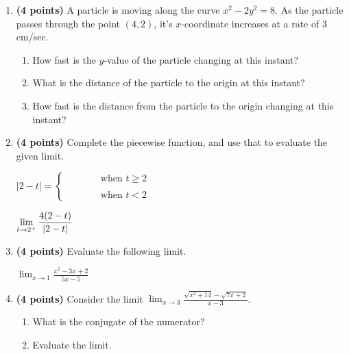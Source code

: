 \documentclass[12pt]{amsart}
\begin{document}
\begin{enumerate}
\vspace{2cm}
\newpage\def \b{2}\def \x{4}\def \y{2}\def \xchange{3}\def \ratrhs{8}\def \cirrhs{24}\def \hyprhs{8}\def \compy{2y^{2}}\def \ychangenum{6}\def \dist{20}\def \fracrat{18}\def \fraccirc{12}\def \frachyp{36}
\item {\bf (4 points)} 
 A particle is moving along the curve $x^2 - \compy = \hyprhs$. As the particle passes through the point $(\x,\y)$, it's $x$-coordinate increases at a rate of $\xchange$cm/sec. \begin{enumerate}
\item How fast is the $y$-value of the particle changing at this instant? \vfill
\item What is the distance of the particle to the origin at this instant? \vfill
\item How fast is the distance from the particle to the origin changing at this instant? \vfill
\end{enumerate}

\newpage\def \a{2}\def \k{4}\def \abstop{0}\def \ktop{1}
\item {\bf (4 points)} 
 Complete the piecewise function, and use that to evaluate the given limit.

\vspace{.5cm}

$|\a - t| = \begin{cases} \hspace{1cm} & \text{ when } t \geq \a \\ & \\ \hspace{1cm} & \text{ when } t < \a \end{cases}$

\vspace{.5cm}

$\displaystyle \lim_{t \rightarrow \a^+} \frac{\ifthenelse{\ktop=1}{\k}{}\ifthenelse{\abstop=1}{|\a-t|}{(\a-t)}}{\ifthenelse{\ktop=0}{\k}{}\ifthenelse{\abstop=0}{|\a-t|}{(\a-t)}}$

\vfill 
\def \a{1}\def \b{2}\def \k{5}\def \fancyp{x^{2}-3x^{}+2}\def \simplep{5x^{}-5}\def \fancyreduced{-1}\def \niceanstop{\frac{-1}{5}}\def \niceansbottom{-5}
\item {\bf (4 points)} 
 Evaluate the following limit. 

$\displaystyle \lim_{x\rightarrow \a} \frac{\fancyp}{\simplep}$

\vfill 
\newpage\def \a{3}\def \b{4}\def \ab{12}\def \c{14}\def \amb{-1}\def \ansroot{23}\def \firstroot{x^{2}+14}\def \secondroot{7x^{}+2}\def \porm{-1}
\item {\bf (4 points)} 
 Consider the limit $\displaystyle \lim_{x \rightarrow \a} \frac{\sqrt{\firstroot} - \sqrt{\secondroot}}{x-\a}$. \begin{enumerate}
\item What is the conjugate of the numerator? \vspace{3cm}
\item Evaluate the limit.
\end{enumerate}


\end{enumerate}
\end{document}

